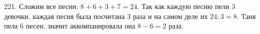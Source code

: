 221. Сложим все песни: $8+6+3+7=24.$ Так как каждую песню пели 3 девочки, каждая песня была посчитана 3 раза и на самом деле их $24:3=8.$ Таня пела 6 песен, значит аккомпанировала она $8-6=2$ раза.\\
